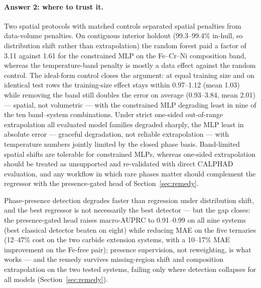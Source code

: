 \documentclass[preprint,12pt,authoryear]{elsarticle}
\begin{document}
\paragraph{Answer 2: where to trust it.}
Two spatial protocols with matched controls separated spatial penalties
from data-volume penalties. On contiguous interior holdout
(99.3--99.4\% in-hull, so distribution shift rather than extrapolation)
the random forest paid a factor of 3.11 against 1.61 for the constrained
MLP on the Fe--Cr--Ni composition band, whereas the temperature-band
penalty is mostly a data effect against the random control. The
ideal-form control closes the argument: at equal training size and on
identical test rows the training-size effect stays within 0.97--1.12
(mean 1.03) while removing the band still doubles the error on average
(0.93--3.84, mean 2.01) --- spatial, not volumetric --- with the
constrained MLP degrading least in nine of the ten band--system
combinations. Under strict
one-sided out-of-range extrapolation all evaluated model families
degraded sharply, the MLP least in absolute error --- graceful
degradation, not reliable extrapolation --- with temperature numbers
jointly limited by the closed phase basis. Band-limited spatial shifts
are tolerable for constrained MLPs, whereas one-sided extrapolation
should be treated as unsupported and re-validated with direct CALPHAD
evaluation, and any workflow in which rare phases matter should
complement the regressor with the presence-gated head of
Section~\ref{sec:remedy}.

Phase-presence detection degrades faster than regression under distribution
shift, and the best regressor is not necessarily the best detector --- but
the gap closes: the presence-gated head raises macro-AUPRC to 0.91--0.99
on all nine systems (best classical detector beaten on eight) while
reducing MAE on the five ternaries (12--47\% cost on the two carbide
extension systems, with a 10--17\% MAE improvement on the Fe-free pair);
presence supervision, not reweighting, is what works --- and the
remedy survives missing-region shift and composition extrapolation on the
two tested systems, failing only where detection collapses for all models
(Section~\ref{sec:remedy}).
\end{document}

